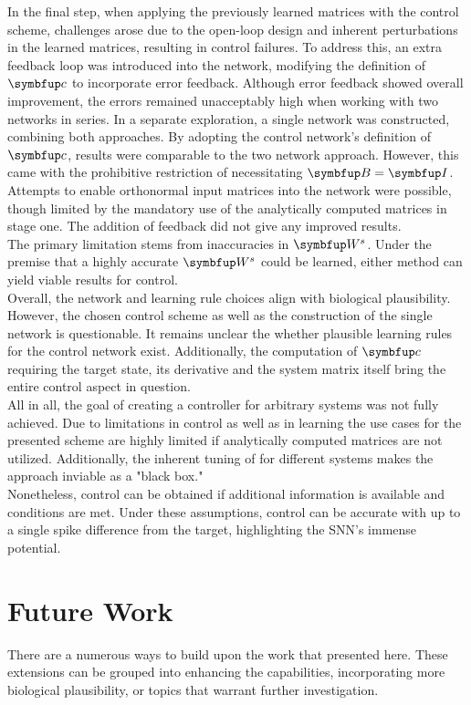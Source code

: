 In the final step, when applying the previously learned matrices with the control scheme, challenges arose due to the open-loop design and inherent perturbations in the learned matrices, resulting in control failures. To address this, an extra feedback loop was introduced into the network, modifying the definition of $\bmu{c}$ to incorporate error feedback. Although error feedback showed overall improvement, the errors remained unacceptably high when working with two networks in series. In a separate exploration, a single network was constructed, combining both approaches. By adopting the control network's definition of $\bmu{c}$, results were comparable to the two network approach. However, this came with the prohibitive restriction of necessitating $\bmu{B} = \bmu{I}$. Attempts to enable orthonormal input matrices into the network were possible, though limited by the mandatory use of the analytically computed matrices in stage one. The addition of feedback did not give any improved results.\\

The primary limitation stems from inaccuracies in $\bmu{W}^s$. Under the premise that a highly accurate $\bmu{W}^s$ could be learned, either method can yield viable results for control.\\
Overall, the network and learning rule choices align with biological plausibility. However, the chosen control scheme as well as the construction of the single network is questionable. It remains unclear the whether plausible learning rules for the control network exist. Additionally, the computation of $\bmu{c}$ requiring the target state, its derivative and the system matrix itself bring the entire control aspect in question.\\

All in all, the goal of creating a controller for arbitrary systems was not fully achieved. Due to limitations in control as well as in learning the use cases for the presented scheme are highly limited if analytically computed matrices are not utilized. Additionally, the inherent tuning of for different systems makes the approach inviable as a "black box."\\
Nonetheless, control can be obtained if additional information is available and conditions are met. Under these assumptions, control can be accurate with up to a single spike difference from the target, highlighting the \ac{SNN}'s immense potential.

\section{Future Work}
There are a numerous ways to build upon the work that presented here. These extensions can be grouped into enhancing the capabilities, incorporating more biological plausibility, or topics that warrant further investigation.
